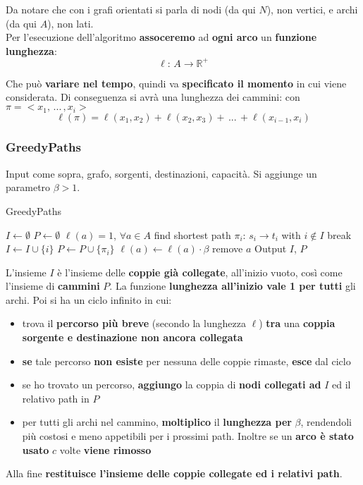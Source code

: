 Da notare che con i grafi orientati si parla di nodi (da qui $N$), non vertici, e archi (da qui $A$), non lati.\\

Per l'esecuzione dell'algoritmo \textbf{assoceremo} ad \textbf{ogni arco} un \textbf{funzione lunghezza}:
$$ \ell: \, A \rightarrow \mathbb{R}^+ $$

Che può \textbf{variare nel tempo}, quindi va \textbf{specificato il momento} in cui viene considerata. Di conseguenza si avrà una lunghezza dei cammini: con $\pi = <x_1, \, ... \, , x_i>$
$$ \ell (\pi) = \ell (x_1, x_2) + \ell (x_2, x_3) + \, ...  \, + \ell (x_{i-1}, x_i) $$

\newpage

\subsubsection{GreedyPaths}
Input come sopra, grafo, sorgenti, destinazioni, capacità. Si aggiunge un parametro $\beta>1$.

\begin{algorithm}
	\caption{GreedyPaths}
	\begin{algorithmic}
		\STATE $I \leftarrow \emptyset$
		\STATE $P \leftarrow \emptyset$
		\STATE $\ell(a) = 1 $, $\forall a \in A$
		\STATE find shortest path $\pi_i: \, s_i \rightarrow t_i$ with $i \notin I$
		\STATE break
		\ENDIF
		\STATE $I \leftarrow I \cup \{i\}$
		\STATE $P \leftarrow P \cup \{\pi_i\}$
		\STATE $\ell (a) \leftarrow \ell (a) \cdot \beta$
		\STATE remove $a$
		\ENDIF
		\ENDFOR
		\ENDWHILE
		\STATE Output $I$, $P$
	\end{algorithmic}
\end{algorithm}

L'insieme $I$ è l'insieme delle \textbf{coppie già collegate}, all'inizio vuoto, così come l'insieme di \textbf{cammini} $P$. La funzione \textbf{lunghezza all'inizio vale 1 per tutti} gli archi. Poi si ha un ciclo infinito in cui: 
\begin{itemize}
	\item trova il \textbf{percorso più breve} (secondo la lunghezza $\ell$) \textbf{tra} una \textbf{coppia sorgente e destinazione non ancora collegata}
	\item \textbf{se} tale percorso \textbf{non esiste} per nessuna delle coppie rimaste, \textbf{esce} dal ciclo
	\item se ho trovato un percorso, \textbf{aggiungo} la coppia di \textbf{nodi collegati ad} $I$ ed il relativo path in $P$
	\item per tutti gli archi nel cammino, \textbf{moltiplico} il \textbf{lunghezza per} $\beta$, rendendoli più costosi e meno appetibili per i prossimi path. Inoltre se un \textbf{arco è stato usato} $c$ volte \textbf{viene rimosso}
\end{itemize}
Alla fine \textbf{restituisce l'insieme delle coppie collegate ed i relativi path}.\\

